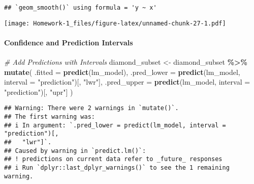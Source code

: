 \documentclass[
]{article}
\newenvironment{Shaded}{\begin{snugshade}}{\end{snugshade}}
\newcommand{\AttributeTok}[1]{\textcolor[rgb]{0.13,0.29,0.53}{#1}}
\newcommand{\CommentTok}[1]{\textcolor[rgb]{0.56,0.35,0.01}{\textit{#1}}}
\newcommand{\FunctionTok}[1]{\textcolor[rgb]{0.13,0.29,0.53}{\textbf{#1}}}
\newcommand{\NormalTok}[1]{#1}
\newcommand{\OtherTok}[1]{\textcolor[rgb]{0.56,0.35,0.01}{#1}}
\newcommand{\SpecialCharTok}[1]{\textcolor[rgb]{0.81,0.36,0.00}{\textbf{#1}}}
\newcommand{\StringTok}[1]{\textcolor[rgb]{0.31,0.60,0.02}{#1}}
\begin{document}
\begin{verbatim}
## `geom_smooth()` using formula = 'y ~ x'
\end{verbatim}

\texttt{[image: Homework-1\_files/figure-latex/unnamed-chunk-27-1.pdf]}

\paragraph{Confidence and Prediction
Intervals}\label{confidence-and-prediction-intervals}

\begin{Shaded}
\begin{Highlighting}[]
\CommentTok{\# Add Predictions with Intervals}
\NormalTok{diamond\_subset }\OtherTok{\textless{}{-}}\NormalTok{ diamond\_subset }\SpecialCharTok{\%\textgreater{}\%}
  \FunctionTok{mutate}\NormalTok{(}
    \AttributeTok{.fitted =} \FunctionTok{predict}\NormalTok{(lm\_model),}
    \AttributeTok{.pred\_lower =} \FunctionTok{predict}\NormalTok{(lm\_model, }\AttributeTok{interval =} \StringTok{"prediction"}\NormalTok{)[, }\StringTok{"lwr"}\NormalTok{],}
    \AttributeTok{.pred\_upper =} \FunctionTok{predict}\NormalTok{(lm\_model, }\AttributeTok{interval =} \StringTok{"prediction"}\NormalTok{)[, }\StringTok{"upr"}\NormalTok{]}
\NormalTok{  )}
\end{Highlighting}
\end{Shaded}

\begin{verbatim}
## Warning: There were 2 warnings in `mutate()`.
## The first warning was:
## i In argument: `.pred_lower = predict(lm_model, interval = "prediction")[,
##   "lwr"]`.
## Caused by warning in `predict.lm()`:
## ! predictions on current data refer to _future_ responses
## i Run `dplyr::last_dplyr_warnings()` to see the 1 remaining warning.
\end{verbatim}
\end{document}
